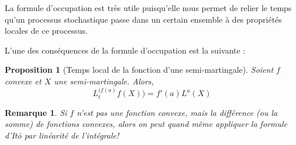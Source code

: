 \documentclass[openany]{book}
\newcommand{\1}{\mathbbm{1}}
\theoremstyle{thmfont}
\theoremstyle{deffont}
\theoremstyle{thmfont}
\newtheorem{prop}[prop]{Proposition}
\theoremstyle{deffont}
\newtheorem*{remark}{Remarque}
\begin{document}
La formule d'occupation est très utile puisqu'elle nous permet de relier le temps qu’un processus stochastique passe dans un certain ensemble à des propriétés locales de ce processus.

L'une des conséquences de la formule d'occupation est la suivante :

\begin{prop}[Temps local de la fonction d'une semi-martingale]
  Soient $f$ convexe et $X$ une semi-martingale. Alors,
  $$L_t^{(f(a)}f(X)) = f'(a) L^a(X)$$
\end{prop}

\begin{remark}
  Si $f$ n'est pas une fonction convexe, mais la différence (ou la somme) de fonctions convexes, alors on peut quand même appliquer la formule d'Itō par linéarité de l'intégrale!
\end{remark}
\end{document}

